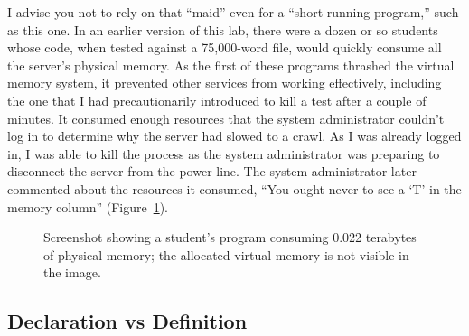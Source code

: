 I advise you not to rely on that ``maid'' even for a ``short-running program,'' such as this one.
In an earlier version of this lab, there were a dozen or so students whose code, when tested against a 75,000-word file, would quickly consume all the server's physical memory.
As the first of these programs thrashed the virtual memory system, it prevented other services from working effectively, including the one that I had precautionarily introduced to kill a test after a couple of minutes.
It consumed enough resources that the system administrator couldn't log in to determine why the server had slowed to a crawl.
As I was already logged in, I was able to kill the process as the system administrator was preparing to disconnect the server from the power line.
The system administrator later commented about the resources it consumed, ``You ought never to see a `T' in the memory column'' (Figure~\ref{fig:tooMuchMemoryUsed}).

\begin{figure}
    \center
    \caption{Screenshot showing a student's program consuming 0.022 terabytes of physical memory;
    the allocated virtual memory is not visible in the image.\label{fig:tooMuchMemoryUsed}}
\end{figure}

%
%

\subsection{Declaration vs Definition}

